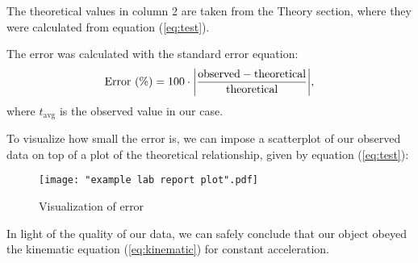\documentclass{article}
\begin{document}
The theoretical values in column 2 are taken from the Theory section, where they were calculated from equation (\ref{eq:test}).

The error was calculated with the standard error equation:
\begin{equation}
    \text{Error (\%)} = 100\cdot\abs{\frac{\text{observed}-\text{theoretical}}{\text{theoretical}}},
\end{equation}
where $t_\text{avg}$ is the observed value in our case.

To visualize how small the error is, we can impose a scatterplot of our observed data on top of a plot of the theoretical relationship, given by equation (\ref{eq:test}):
\begin{figure}[H]
\centering
\texttt{[image: "example lab report plot".pdf]}
\caption{Visualization of error}
\end{figure}

In light of the quality of our data, we can safely conclude that our object obeyed the kinematic equation (\ref{eq:kinematic}) for constant acceleration.
\end{document}
